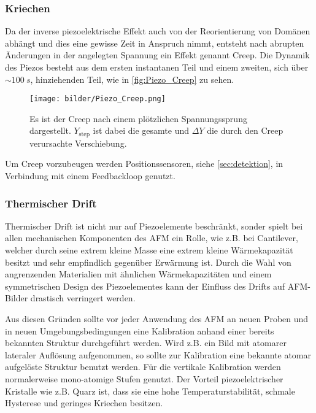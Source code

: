     \subsubsection*{Kriechen} \vspace*{-0.25cm}
        Da der inverse piezoelektrische Effekt auch von der Reorientierung von Domänen abhängt und dies eine gewisse Zeit in Anspruch nimmt, entsteht nach abrupten Änderungen in der angelegten Spannung ein Effekt genannt \glqq Creep\grqq.
        Die Dynamik des Piezos besteht aus dem ersten instantanen Teil und einem zweiten, sich über $\sim \SI{100}{s}$, hinziehenden Teil, wie in \autoref{fig:Piezo_Creep} zu sehen.
        \begin{figure}[ht]
            \centering\captionsetup{format=plain}
            \texttt{[image: bilder/Piezo\_Creep.png]}
            \caption{Es ist der Creep nach einem plötzlichen Spannungssprung dargestellt. $Y_{\mathrm{step}}$ ist dabei die gesamte und $\Delta Y$ die durch den Creep verursachte Verschiebung. \cite{Compensation_of_Scanner_Creep}}
            \label{fig:Piezo_Creep}
        \end{figure}
        Um Creep vorzubeugen werden Positionssensoren, siehe \autoref{sec:detektion}, in Verbindung mit einem Feedbackloop genutzt.
        

    \subsubsection*{Thermischer Drift} \vspace*{-0.25cm}
        Thermischer Drift ist nicht nur auf Piezoelemente beschränkt, sonder spielt bei allen mechanischen Komponenten des AFM ein Rolle, wie z.B. bei Cantilever, welcher durch seine extrem kleine Masse eine extrem kleine Wärmekapazität besitzt und sehr empfindlich gegenüber Erwärmung ist.
        Durch die Wahl von angrenzenden Materialien mit ähnlichen Wärmekapazitäten und einem symmetrischen Design des Piezoelementes kann der Einfluss des Drifts auf AFM-Bilder drastisch verringert werden.
        
    \vspace*{0.5cm}
    Aus diesen Gründen sollte vor jeder Anwendung des AFM an neuen Proben und in neuen Umgebungsbedingungen eine Kalibration anhand einer bereits bekannten Struktur durchgeführt werden.
    Wird z.B. ein Bild mit atomarer lateraler Auflösung aufgenommen, so sollte zur Kalibration eine bekannte atomar aufgelöste Struktur benutzt werden.
    Für die vertikale Kalibration werden normalerweise mono-atomige Stufen genutzt.
    Der Vorteil piezoelektrischer Kristalle wie z.B. Quarz ist, dass sie eine hohe Temperaturstabilität, schmale Hysterese und geringes Kriechen besitzen.